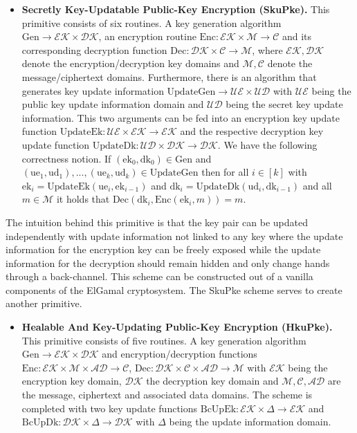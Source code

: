 \documentclass[11pt,a4paper,twoside,openright,bibliography=totoc]{scrbook}
\renewcommand{\t}{\text} %
\begin{document}
\begin{itemize}
\item \textbf{Secretly Key-Updatable Public-Key Encryption (SkuPke).} This
  primitive consists of six routines. A key generation algorithm
  $\t{Gen} \rightarrow \mathcal{EK} \times \mathcal{DK}$, an encryption
  routine $\t{Enc}: \mathcal{EK} \times \mathcal{M} \rightarrow \mathcal{C}$ and
  its corresponding decryption function
  $\t{Dec}: \mathcal{DK} \times \mathcal{C} \rightarrow \mathcal{M}$, where
  $\mathcal{EK},\mathcal{DK}$ denote the encryption/decryption key domains
  and $\mathcal{M},\mathcal{C}$ denote the message/ciphertext domains.
  Furthermore, there is an algorithm that generates key update information
  $\t{UpdateGen} \rightarrow \mathcal{UE} \times \mathcal{UD}$ with
  $\mathcal{UE}$ being the public key update information domain and
  $\mathcal{UD}$ being the secret key update information. This two
  arguments can be fed into an encryption key update function
  $\t{UpdateEk}: \mathcal{UE} \times \mathcal{EK} \rightarrow \mathcal{EK}$
  and the respective decryption key update function
  $\t{UpdateDk}: \mathcal{UD} \times \mathcal{DK} \rightarrow \mathcal{DK}$.
  We have the following correctness notion. If $(\t{ek}_0,\t{dk}_0) \in \t{Gen}$ and
  $(\t{ue}_1,\t{ud}_1),...,(\t{ue}_k,\t{ud}_k) \in \t{UpdateGen}$ then
  for all $i \in [k]$ with $\t{ek}_i = \t{UpdateEk}(\t{ue}_i, \t{ek}_{i-1})$ and
  $\t{dk}_i = \t{UpdateDk}(\t{ud}_i, \t{dk}_{i-1})$ and all $m \in \mathcal{M}$
  it holds that $\t{Dec}(\t{dk}_i,\t{Enc}(\t{ek}_i, m)) = m$.
\end{itemize}

The intuition behind this primitive is that the key pair can be
updated independently with update information not linked to any
key where the update information for the encryption key can be freely
exposed while the update information for the decryption should
remain hidden and only change hands through a back-channel.
This scheme can be constructed out of a vanilla components
of the ElGamal cryptosystem. The SkuPke scheme serves to
create another primitive.
\begin{itemize}
\item \textbf{Healable And Key-Updating Public-Key Encryption (HkuPke).} This
  primitive consists of five routines. A key generation algorithm
  $\t{Gen} \rightarrow \mathcal{EK} \times \mathcal{DK}$ and encryption/decryption
  functions
  $\t{Enc}: \mathcal{EK} \times \mathcal{M} \times \mathcal{AD} \rightarrow \mathcal{C}$,
  $\t{Dec}: \mathcal{DK} \times \mathcal{C} \times \mathcal{AD} \rightarrow \mathcal{M}$
  with $\mathcal{EK}$ being the encryption key domain, $\mathcal{DK}$ the decryption
  key domain and $\mathcal{M},\mathcal{C},\mathcal{AD}$ are the message, ciphertext
  and associated data domains. The scheme is completed with two key update
  functions $\t{BcUpEk}: \mathcal{EK} \times \Delta \rightarrow \mathcal{EK}$ and
  $\t{BcUpDk}: \mathcal{DK} \times \Delta \rightarrow \mathcal{DK}$ with
  $\Delta$ being the update information domain.
\end{itemize}
\end{document}
